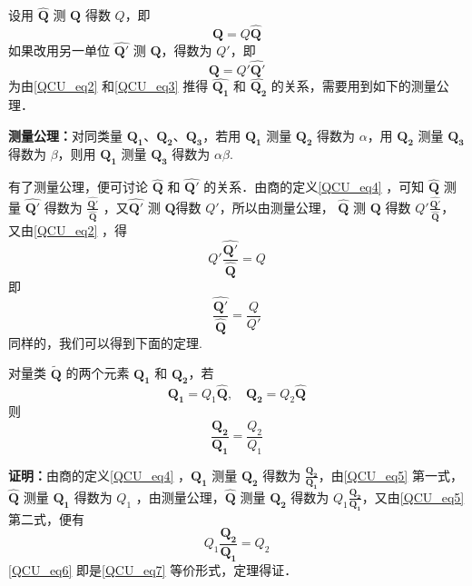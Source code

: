 设用 $\hat{\boldsymbol{Q}}$ 测 $\boldsymbol{Q}$ 得数 $Q$，即
\begin{equation}\label{QCU_eq2}
\boldsymbol{Q}=Q\hat{\boldsymbol{Q}}
\end{equation}
如果改用另一单位 $\hat{\boldsymbol{Q'}}$ 测 $\boldsymbol{Q}$，得数为 $Q'$，即
\begin{equation}\label{QCU_eq3}
\boldsymbol{Q}=Q'\hat{\boldsymbol{Q'}}
\end{equation}
为由\autoref{QCU_eq2} 和\autoref{QCU_eq3} 推得 $\hat{\boldsymbol{Q_1}}$ 和 $\hat{\boldsymbol{Q_2}}$ 的关系，需要用到如下的测量公理．

\textbf{测量公理：}对同类量 $\boldsymbol{Q_1}$、$\boldsymbol{Q_2}$、$\boldsymbol{Q_3}$，若用 $\boldsymbol{Q_1}$ 测量 $\boldsymbol{Q_2}$ 得数为 $\alpha$，用 $\boldsymbol{Q_2}$ 测量 $\boldsymbol{Q_3}$ 得数为 $\beta$，则用 $\boldsymbol{Q_1}$ 测量 $\boldsymbol{Q_3}$ 得数为 $\alpha\beta$.

有了测量公理，便可讨论 $\hat{\boldsymbol{Q}}$ 和 $\hat{\boldsymbol{Q'}}$ 的关系．由商的定义\autoref{QCU_eq4} ，可知 $\hat{\boldsymbol{Q}}$ 测量 $\hat{\boldsymbol{Q'}}$ 得数为 $\frac{\hat{\boldsymbol{Q'}}}{\hat{\boldsymbol{Q}}}$ ，又$\hat{\boldsymbol{Q'}}$ 测 $\boldsymbol{Q}$得数 $Q'$，所以由测量公理， $\hat{\boldsymbol{Q}}$ 测 $\boldsymbol{Q}$ 得数 $Q'\frac{\hat{\boldsymbol{Q'}}}{\hat{\boldsymbol{Q}}}$，又由\autoref{QCU_eq2} ，得
\begin{equation}
Q'\frac{\hat{\boldsymbol{Q'}}}{\hat{\boldsymbol{Q}}}=Q
\end{equation}
即
\begin{equation}\label{QCU_eq8}
\frac{\hat{\boldsymbol{Q'}}}{\hat{\boldsymbol{Q}}}=\frac{Q}{Q'}
\end{equation}
同样的，我们可以得到下面的定理.
\begin{theorem}{}
对量类 $\widetilde{\boldsymbol{Q}}$ 的两个元素 $\boldsymbol{Q_1}$ 和 $\boldsymbol{Q_2}$，若
\begin{equation}\label{QCU_eq5}
\boldsymbol{Q_1}=Q_1\hat{\boldsymbol{Q}},\quad \boldsymbol{Q_2}=Q_2\hat{\boldsymbol{Q}}
\end{equation}
则
\begin{equation}\label{QCU_eq7}
\frac{\boldsymbol{Q_2}}{\boldsymbol{Q_1}}=\frac{Q_2}{Q_1}
\end{equation}
\end{theorem}
\textbf{证明：}由商的定义\autoref{QCU_eq4} ，$\boldsymbol{Q_1}$ 测量 $\boldsymbol{Q_2}$ 得数为 $\frac{\boldsymbol{Q_2}}{\boldsymbol{Q_1}}$，由\autoref{QCU_eq5} 第一式， $\hat{\boldsymbol{Q}}$ 测量 $\boldsymbol{Q_1}$ 得数为 $Q_1$ ，由测量公理，$\hat{\boldsymbol{Q}}$ 测量 $\boldsymbol{Q_2}$ 得数为 $Q_1\frac{\boldsymbol{Q_2}}{\boldsymbol{Q_1}}$，又由\autoref{QCU_eq5} 第二式，便有
\begin{equation}\label{QCU_eq6}
Q_1\frac{\boldsymbol{Q_2}}{\boldsymbol{Q_1}}=Q_2
\end{equation}
\autoref{QCU_eq6} 即是\autoref{QCU_eq7} 等价形式，定理得证．


